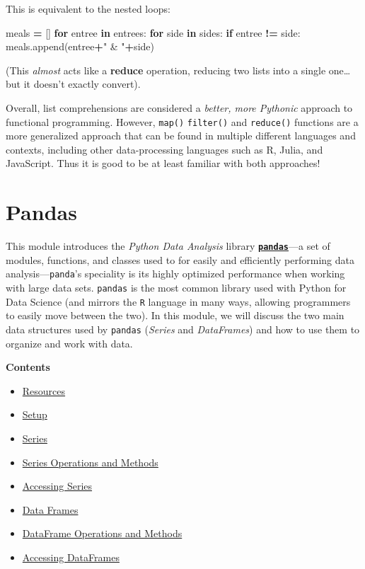 \documentclass[]{book}
\newenvironment{Shaded}{\begin{snugshade}}{\end{snugshade}}
\newcommand{\KeywordTok}[1]{\textcolor[rgb]{0.13,0.29,0.53}{\textbf{#1}}}
\newcommand{\StringTok}[1]{\textcolor[rgb]{0.31,0.60,0.02}{#1}}
\newcommand{\ControlFlowTok}[1]{\textcolor[rgb]{0.13,0.29,0.53}{\textbf{#1}}}
\newcommand{\OperatorTok}[1]{\textcolor[rgb]{0.81,0.36,0.00}{\textbf{#1}}}
\newcommand{\NormalTok}[1]{#1}
\providecommand{\tightlist}{%
  \setlength{\itemsep}{0pt}\setlength{\parskip}{0pt}}
\begin{document}
This is equivalent to the nested loops:

\begin{Shaded}
\begin{Highlighting}[]
\NormalTok{meals }\OperatorTok{=}\NormalTok{ []}
\ControlFlowTok{for}\NormalTok{ entree }\KeywordTok{in}\NormalTok{ entrees:}
    \ControlFlowTok{for}\NormalTok{ side }\KeywordTok{in}\NormalTok{ sides:}
        \ControlFlowTok{if}\NormalTok{ entree }\OperatorTok{!=}\NormalTok{ side:}
\NormalTok{            meals.append(entree}\OperatorTok{+}\StringTok{" & "}\OperatorTok{+}\NormalTok{side)}
\end{Highlighting}
\end{Shaded}

(This \emph{almost} acts like a \textbf{reduce} operation, reducing two
lists into a single one\ldots{} but it doesn't exactly convert).

Overall, list comprehensions are considered a \emph{better, more
Pythonic} approach to functional programming. However, \texttt{map()}
\texttt{filter()} and \texttt{reduce()} functions are a more generalized
approach that can be found in multiple different languages and contexts,
including other data-processing languages such as R, Julia, and
JavaScript. Thus it is good to be at least familiar with both
approaches!

\chapter{Pandas}\label{pandas}

This module introduces the \emph{Python Data Analysis} library
\href{http://pandas.pydata.org/}{\textbf{\texttt{pandas}}}---a set of
modules, functions, and classes used to for easily and efficiently
performing data analysis---\texttt{panda}'s speciality is its highly
optimized performance when working with large data sets. \texttt{pandas}
is the most common library used with Python for Data Science (and
mirrors the \texttt{R} language in many ways, allowing programmers to
easily move between the two). In this module, we will discuss the two
main data structures used by \texttt{pandas} (\emph{Series} and
\emph{DataFrames}) and how to use them to organize and work with data.

\textbf{Contents}

\begin{itemize}
\tightlist
\item
  \protect\hyperlink{resources}{Resources}
\item
  \protect\hyperlink{setup}{Setup}
\item
  \protect\hyperlink{series}{Series}
\item
  \protect\hyperlink{series-operations-and-methods}{Series Operations
  and Methods}
\item
  \protect\hyperlink{accessing-series}{Accessing Series}
\item
  \protect\hyperlink{data-frames}{Data Frames}
\item
  \protect\hyperlink{dataframe-operations-and-methods}{DataFrame
  Operations and Methods}
\item
  \protect\hyperlink{accessing-dataframes}{Accessing DataFrames}
\end{itemize}
\end{document}
